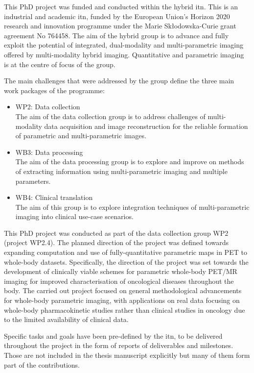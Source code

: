 This PhD project was funded and conducted within the \Gls{hybrid} \gls{itn}. This is an industrial and academic \gls{itn}, funded by the European Union's Horizon 2020 research and innovation programme under the Marie Sk\l{}odowska-Curie grant agreement No 764458.
The aim of the \gls{hybrid} group is to advance and fully exploit the potential of integrated, dual-modality and multi-parametric imaging offered by multi-modality hybrid imaging. Quantitative and parametric imaging is at the centre of focus of the group. 

The main challenges that were addressed by the group define the three main work packages of the programme:
\begin{itemize}
    \item WP2: Data collection \\
    The aim of the data collection group is to address challenges of multi-modality data acquisition and image reconstruction for the reliable formation of parametric and multi-parametric images.
    \item WB3: Data processing \\
    The aim of the data processing group is to explore and improve on methods of extracting information using multi-parametric imaging and multiple parameters. 
    \item WB4: Clinical translation \\
    The aim of this group is to explore integration techniques of multi-parametric imaging into clinical use-case scenarios. 
\end{itemize}

This PhD project was conducted as part of the data collection group WP2 (project WP2.4). The planned direction of the project was defined towards expanding computation and use of fully-quantitative parametric maps in PET to whole-body datasets. Specifically, the direction of the project was set towards the development of clinically viable schemes for parametric whole-body PET/MR imaging for improved characterisation of oncological diseases throughout the body. The carried out project focused on general methodological advancements for whole-body parametric imaging, with applications on real data focusing on whole-body pharmacokinetic studies rather than clinical studies in oncology due to the limited availability of clinical data.

Specific tasks and goals have been pre-defined by the \gls{itn}, to be delivered throughout the project in the form of reports of deliverables and milestones. Those are not included in the thesis manuscript explicitly but many of them form part of the contributions. 

